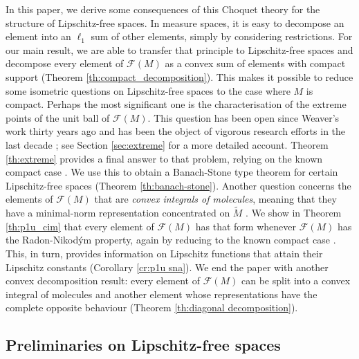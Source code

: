 \documentclass[a4paper,10pt]{amsart}
\newcommand{\lipfree}[1]{\mathcal{F}({#1})}                 %
\newcommand{\wt}[1]{\widetilde{#1}}                         %
\theoremstyle{plain}
\theoremstyle{definition}
\theoremstyle{remark}
\begin{document}
In this paper, we derive some consequences of this Choquet theory for the structure of Lipschitz-free spaces. In measure spaces, it is easy to decompose an element into an $\ell_1$ sum of other elements, simply by considering restrictions. For our main result, we are able to transfer that principle to Lipschitz-free spaces and decompose every element of $\lipfree{M}$ as a convex sum of elements with compact support (Theorem \ref{th:compact_decomposition}). This makes it possible to reduce some isometric questions on Lipschitz-free spaces to the case where $M$ is compact. Perhaps the most significant one is the characterisation of the extreme points of the unit ball of $\lipfree{M}$. This question has been open since Weaver's work thirty years ago \cite{Weaver95} and has been the object of vigorous research efforts in the last decade \cite{Aliaga,AliagaGuirao,AP_rmi,APPP_2020,APS1,APP,GPPR,GPAZ,Weaver2}; see Section \ref{sec:extreme} for a more detailed account. Theorem \ref{th:extreme} provides a final answer to that problem, relying on the known compact case \cite{Aliaga}. We use this to obtain a Banach-Stone type theorem for certain Lipschitz-free spaces (Theorem \ref{th:banach-stone}). Another question concerns the elements of $\lipfree{M}$ that are \emph{convex integrals of molecules}, meaning that they have a minimal-norm representation concentrated on $\wt{M}$ \cite{APS1}. We show in Theorem \ref{th:p1u_cim} that every element of $\lipfree{M}$ has that form whenever $\lipfree{M}$ has the Radon-Nikod\'ym property, again by reducing to the known compact case \cite{APS2}. This, in turn, provides information on Lipschitz functions that attain their Lipschitz constants (Corollary \ref{cr:p1u sna}). We end the paper with another convex decomposition result: every element of $\lipfree{M}$ can be split into a convex integral of molecules and another element whose representations have the complete opposite behaviour (Theorem \ref{th:diagonal decomposition}).



\subsection{Preliminaries on Lipschitz-free spaces}
\label{sec:lipschitz-free}
\end{document}
